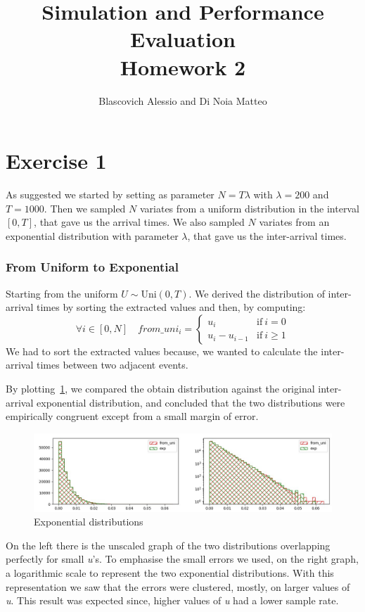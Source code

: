 \documentclass[10pt,a4paper]{article}
\title{
  {\Huge Simulation and Performance Evaluation}\\
  \huge Homework 2 \\
}
\author{Blascovich Alessio and Di Noia Matteo}
\begin{document}
\maketitle

\section*{Exercise 1}

As suggested we started by setting as parameter \(N=T\lambda\) with \(\lambda = 200\) and \(T = 1000\). Then we sampled \(N\) variates from a uniform distribution in the interval \([0,T]\), that gave us the arrival times. We also sampled \(N\) variates from an exponential distribution with parameter \(\lambda\), that gave us the inter-arrival times.
\subsubsection*{From Uniform to Exponential}
Starting from the uniform \(U\sim\text{Uni}(0, T)\). We derived the distribution of inter-arrival times by sorting the extracted values and then, by computing:
\begin{equation*}
  \forall i\in[0,N]\quad from\_uni_{i} =
  \begin{cases}
    u_{i} & \text{if}\ i = 0\\
    u_{i} - u_{i-1} & \text{if}\ i\geq 1
  \end{cases}
\end{equation*}
We had to sort the extracted values because, we wanted to calculate the inter-arrival times between two adjacent events.

By plotting~\ref{fig:1}, we compared the obtain distribution against the original inter-arrival exponential distribution, and concluded that the two distributions were empirically congruent except from a small margin of error.

\begin{figure}[h]
  \centering
  \includegraphics[scale=0.5]{es1-1.png}
  \caption{Exponential distributions}
  \label{fig:1}
\end{figure}

On the left there is the unscaled graph of the two distributions overlapping perfectly for small \emph{u}'s. To emphasise the small errors we used, on the right graph, a logarithmic scale to represent the two exponential distributions. With this representation we saw that the errors were clustered, mostly, on larger values of \emph{u}. This result was expected since, higher values of \emph{u} had a lower sample rate.
\end{document}
